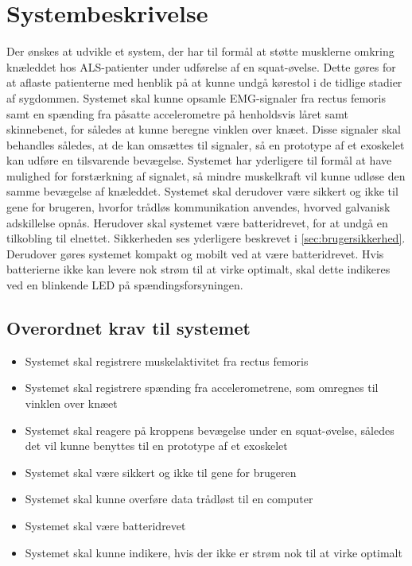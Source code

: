 \section{Systembeskrivelse}
Der ønskes at udvikle et system, der har til formål at støtte musklerne omkring knæleddet hos ALS-patienter under udførelse af en squat-øvelse. Dette gøres for at aflaste patienterne med henblik på at kunne undgå kørestol i de tidlige stadier af sygdommen. 
Systemet skal kunne opsamle EMG-signaler fra rectus femoris samt en spænding fra påsatte accelerometre på henholdsvis låret samt skinnebenet, for således at kunne beregne vinklen over knæet. Disse signaler skal behandles således, at de kan omsættes til signaler, så en prototype af et exoskelet kan udføre en tilsvarende bevægelse. 
Systemet har yderligere til formål at have mulighed for forstærkning af signalet, så mindre muskelkraft vil kunne udløse den samme bevægelse af knæleddet. 
Systemet skal derudover være sikkert og ikke til gene for brugeren, hvorfor trådløs kommunikation anvendes, hvorved galvanisk adskillelse opnås. Herudover skal systemet være batteridrevet, for at undgå en tilkobling til elnettet. Sikkerheden ses yderligere beskrevet i \autoref{sec:brugersikkerhed}. Derudover gøres systemet kompakt og mobilt ved at være batteridrevet. Hvis batterierne ikke kan levere nok strøm til at virke optimalt, skal dette indikeres ved en blinkende LED på spændingsforsyningen. 

\subsection{Overordnet krav til systemet}  \label{sec:overordnet_krav}
\begin{itemize}
\item Systemet skal registrere muskelaktivitet fra rectus femoris 
\item Systemet skal registrere spænding fra accelerometrene, som omregnes til vinklen over knæet
\item Systemet skal reagere på kroppens bevægelse under en squat-øvelse, således det vil kunne benyttes til en prototype af et exoskelet
\item Systemet skal være sikkert og ikke til gene for brugeren 
\item Systemet skal kunne overføre data trådløst til en computer
\item Systemet skal være batteridrevet
\item Systemet skal kunne indikere, hvis der ikke er strøm nok til at virke optimalt
\end{itemize}


